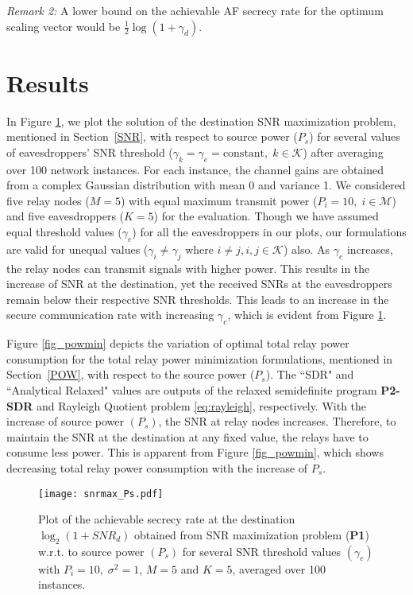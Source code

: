 \documentclass[journal,,draftclsnofoot letterpaper, onecolumn]{IEEEtran}
\begin{document}
\textit{Remark 2:} A lower bound on the achievable AF secrecy rate for the optimum scaling vector would be $\frac{1}{2}\log(1+\gamma_d)$.

\section{Results}
\label{sec:res}
    In Figure \ref{fig_snrmax}, we plot the solution of the destination SNR maximization problem, mentioned in Section~\ref{SNR}, with respect to source power ($P_s$) for several values of eavesdroppers' SNR threshold ($\gamma_k=\gamma_e=\mbox{constant},\;k\in\mathcal{K}$) after averaging over 100 network instances. 
For each instance, the channel gains are obtained from a complex Gaussian distribution with mean 0 and variance 1. We considered five relay nodes ($M=5$) with equal maximum transmit power ($P_i=10,\;i\in\mathcal{M}$) and five eavesdroppers ($K=5$) for the evaluation. Though we have assumed equal threshold values ($\gamma_e$) for all the eavesdroppers in our plots, our formulations are valid for unequal values ($\gamma_i \ne \gamma_j$ where $i\ne j, i,j \in \mathcal{K}$) also.
As $\gamma_e$ increases, the relay nodes can transmit signals with higher power. This results in the increase of SNR at the destination, yet the received SNRs at the eavesdroppers remain below their respective SNR thresholds. This leads to an increase in the secure communication rate with increasing $\gamma_e$, which is evident from Figure \ref{fig_snrmax}.


Figure \ref{fig_powmin} depicts the variation of optimal total relay power consumption for the total relay power minimization formulations, mentioned in Section~\ref{POW}, with respect to the source power ($P_s$).
The ``SDR" and ``Analytical Relaxed" values are outputs of the relaxed semidefinite program \textbf{P2-SDR} and Rayleigh Quotient problem \eqref{eq:rayleigh}, respectively. 
With the increase of source power $(P_s)$, the SNR at relay nodes increases. Therefore, to maintain the SNR at the destination at any fixed value, the relays have to consume less power. This is apparent from Figure \ref{fig_powmin}, which shows decreasing total relay power consumption with the increase of $P_s$. 


\begin{figure}[!t]
\centering
\texttt{[image: snrmax\_Ps.pdf]}
\caption{Plot of the achievable secrecy rate at the destination $\log_2(1+SNR_d)$ obtained from SNR maximization problem (\textbf{P1}) w.r.t. to source power $(P_s)$ for several SNR threshold values $(\gamma_e)$ with $P_i=10,\;\sigma^2=1$, $M=5$ and $K=5$, averaged over 100 instances.}
\label{fig_snrmax}
\vspace{-0.2in}
\end{figure}
\end{document}
